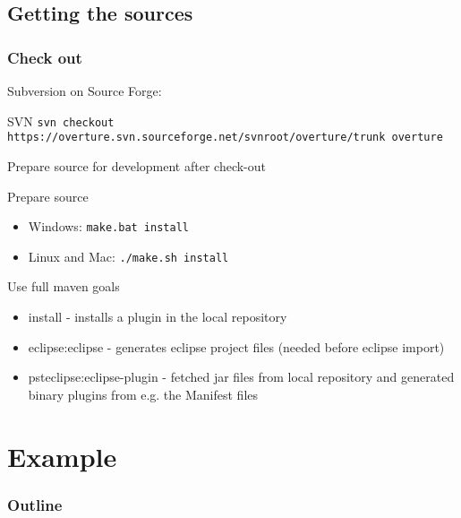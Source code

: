 \subsection{Getting the sources}

\frame
{
  \frametitle{Check out}

Subversion on Source Forge:
\begin{block}{SVN}
\small \texttt{svn checkout https://overture.svn.sourceforge.net/svnroot/overture/trunk overture}
\end{block}

Prepare source for development after check-out
\begin{block}{Prepare source}
\begin{itemize}
	\item Windows: \small \texttt{make.bat install}
	\item Linux and Mac: \small \texttt{./make.sh install}
\end{itemize}
\end{block}

}

\note
{
\begin{block}{Use full maven goals}
\begin{itemize}
	\item install - installs a plugin in the local repository
	\item eclipse:eclipse - generates eclipse project files (needed before eclipse import)
	\item psteclipse:eclipse-plugin - fetched jar files from local repository and generated binary plugins from e.g. the Manifest files
\end{itemize}
\end{block}
}

\section{Example}
%
%
\begin{frame}
  \frametitle{Outline}
  \tableofcontents[current]
\end{frame}


